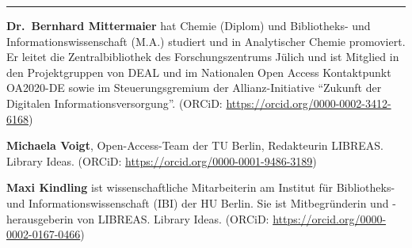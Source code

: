 \begin{center}\rule{0.5\linewidth}{\linethickness}\end{center}

\textbf{Dr.~Bernhard Mittermaier} hat Chemie (Diplom) und Bibliotheks-
und Informationswissenschaft (M.A.) studiert und in Analytischer Chemie
promoviert. Er leitet die Zentralbibliothek des Forschungszentrums
Jülich und ist Mitglied in den Projektgruppen von DEAL und im Nationalen
Open Access Kontaktpunkt OA2020-DE sowie im Steuerungsgremium der
Allianz-Initiative ``Zukunft der Digitalen Informationsversorgung''.
(ORCiD: \url{https://orcid.org/0000-0002-3412-6168})

\textbf{Michaela Voigt}, Open-Access-Team der TU Berlin, Redakteurin
LIBREAS. Library Ideas. (ORCiD:
\url{https://orcid.org/0000-0001-9486-3189})

\textbf{Maxi Kindling} ist wissenschaftliche Mitarbeiterin am Institut
für Bibliotheks- und Informationswissenschaft (IBI) der HU Berlin. Sie
ist Mitbegründerin und -herausgeberin von LIBREAS. Library Ideas.
(ORCiD: \url{https://orcid.org/0000-0002-0167-0466})
